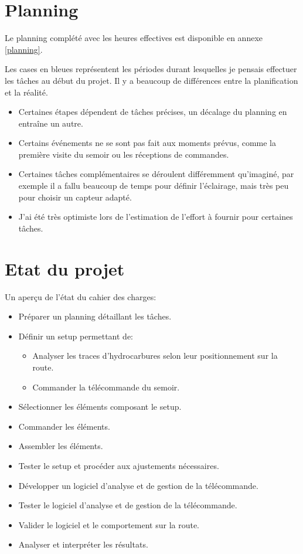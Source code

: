 \section{Planning}
Le planning complété avec les heures effectives est disponible en annexe \ref{planning}.

Les cases en bleues représentent les périodes durant lesquelles je pensais effectuer les tâches au début du projet. Il y a beaucoup de différences entre la planification et la réalité.
\begin{itemize}
    \item Certaines étapes dépendent de tâches précises, un décalage du planning en entraîne un autre.
    \item Certains événements ne se sont pas fait aux moments prévus, comme la première visite du semoir ou les réceptions de commandes.
    \item Certaines tâches complémentaires se déroulent différemment qu'imaginé, par exemple il a fallu beaucoup de temps pour définir l'éclairage, mais très peu pour choisir un capteur adapté.
    \item J'ai été très optimiste lors de l'estimation de l'effort à fournir pour certaines tâches.
\end{itemize}

\section{Etat du projet}
Un aperçu de l'état du cahier des charges:
\begin{itemize}
    \item {} Préparer un planning détaillant les tâches.
    \item Définir un setup permettant de:
          \begin{itemize}
              \item {} Analyser les traces d'hydrocarbures selon leur positionnement sur la route.
              \item {} Commander la télécommande du semoir.
          \end{itemize}
    \item {} Sélectionner les éléments composant le setup.
    \item {} Commander les éléments.
    \item {} Assembler les éléments.
    \item {} Tester le setup et procéder aux ajustements nécessaires.
    \item {} Développer un logiciel d'analyse et de gestion de la télécommande.
    \item {} Tester le logiciel d'analyse et de gestion de la télécommande.
    \item {} Valider le logiciel et le comportement sur la route.
    \item {} Analyser et interpréter les résultats.
\end{itemize}

